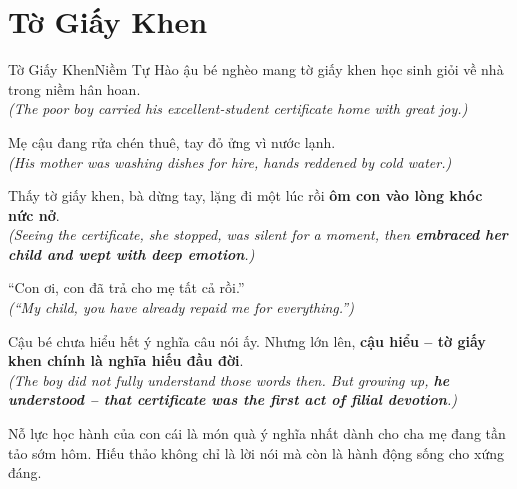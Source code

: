 \section{Tờ Giấy Khen}
\begin{truyen}{Tờ Giấy Khen}{Niềm Tự Hào}
ậu bé nghèo mang tờ giấy khen học sinh giỏi về nhà trong niềm hân hoan.\\
\textit{(The poor boy carried his excellent-student certificate home with great joy.)}

Mẹ cậu đang rửa chén thuê, tay đỏ ửng vì nước lạnh.\\
\textit{(His mother was washing dishes for hire, hands reddened by cold water.)}

Thấy tờ giấy khen, bà dừng tay, lặng đi một lúc rồi \textbf{ôm con vào lòng khóc nức nở}.\\
\textit{(Seeing the certificate, she stopped, was silent for a moment, then \textbf{embraced her child and wept with deep emotion}.)}

``Con ơi, con đã trả cho mẹ tất cả rồi.''\\
\textit{(``My child, you have already repaid me for everything.'')}

Cậu bé chưa hiểu hết ý nghĩa câu nói ấy. Nhưng lớn lên, \textbf{cậu hiểu – tờ giấy khen chính là nghĩa hiếu đầu đời}.\\
\textit{(The boy did not fully understand those words then. But growing up, \textbf{he understood – that certificate was the first act of filial devotion}.)}
\end{truyen}
\begin{baihoc}
  Nỗ lực học hành của con cái là món quà ý nghĩa nhất dành cho cha mẹ đang tần tảo sớm hôm. Hiếu thảo không chỉ là lời nói mà còn là hành động sống cho xứng đáng.
\end{baihoc}

